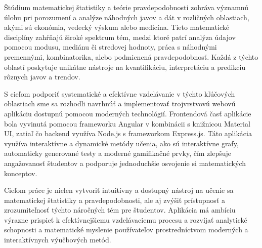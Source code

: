 Štúdium matematickej štatistiky a teórie pravdepodobnosti zohráva významnú úlohu pri porozumení a analýze náhodných javov a dát v rozličných oblastiach, akými sú ekonómia, vedecký výskum alebo medicína. 
Tieto matematické disciplíny zahŕňajú široké spektrum tém, medzi ktoré patrí analýza údajov pomocou modusu, mediánu či stredovej hodnoty, práca s náhodnými premennými, kombinatorika, alebo podmienená pravdepodobnosť. 
Každá z týchto oblastí poskytuje unikátne nástroje na kvantifikáciu, interpretáciu a predikciu rôznych javov a trendov.

S cieľom podporiť systematické a efektívne vzdelávanie v týchto kľúčových oblastiach sme sa rozhodli navrhnúť a implementovať trojvrstvovú webovú aplikáciu dostupnú pomocou moderných technológií.
Frontendová časť aplikácie bola vyvinutá pomocou frameworku Angular v kombinácii s knižnicou Material UI, zatiaľ čo backend využíva Node.js s frameworkom Express.js.
Táto aplikácia využíva interaktívne a dynamické metódy učenia, ako sú interaktívne grafy, automaticky generované testy a moderné gamifikačné prvky, čím zlepšuje angažovanosť študentov a podporuje jednoduchšie osvojenie si matematických konceptov.

Cieľom práce je nielen vytvoriť intuitívny a dostupný nástroj na učenie sa matematickej štatistiky a pravdepodobnosti, ale aj zvýšiť prístupnosť a zrozumiteľnosť týchto náročných tém pre študentov. 
Aplikácia má ambíciu výrazne prispieť k efektívnejšiemu vzdelávaciemu procesu a rozvíjať analytické schopnosti a matematické myslenie používateľov prostredníctvom moderných a interaktívnych výučbových metód.